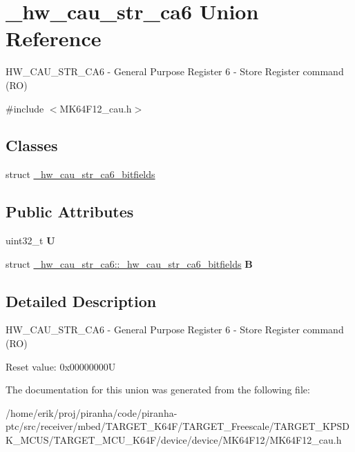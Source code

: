 \hypertarget{union__hw__cau__str__ca6}{}\section{\+\_\+hw\+\_\+cau\+\_\+str\+\_\+ca6 Union Reference}
\label{union__hw__cau__str__ca6}


H\+W\+\_\+\+C\+A\+U\+\_\+\+S\+T\+R\+\_\+\+C\+A6 -\/ General Purpose Register 6 -\/ Store Register command (RO)  




{\ttfamily \#include $<$M\+K64\+F12\+\_\+cau.\+h$>$}

\subsection*{Classes}
\begin{DoxyCompactItemize}
\item 
struct \hyperlink{struct__hw__cau__str__ca6_1_1__hw__cau__str__ca6__bitfields}{\+\_\+hw\+\_\+cau\+\_\+str\+\_\+ca6\+\_\+bitfields}
\end{DoxyCompactItemize}
\subsection*{Public Attributes}
\begin{DoxyCompactItemize}
\item 
uint32\+\_\+t {\bfseries U}\hypertarget{union__hw__cau__str__ca6_a33c04e9413b8ff3eb0d62b6d33fcaa90}{}\label{union__hw__cau__str__ca6_a33c04e9413b8ff3eb0d62b6d33fcaa90}

\item 
struct \hyperlink{struct__hw__cau__str__ca6_1_1__hw__cau__str__ca6__bitfields}{\+\_\+hw\+\_\+cau\+\_\+str\+\_\+ca6\+::\+\_\+hw\+\_\+cau\+\_\+str\+\_\+ca6\+\_\+bitfields} {\bfseries B}\hypertarget{union__hw__cau__str__ca6_a55106bf255f868a6b1b535175e891232}{}\label{union__hw__cau__str__ca6_a55106bf255f868a6b1b535175e891232}

\end{DoxyCompactItemize}


\subsection{Detailed Description}
H\+W\+\_\+\+C\+A\+U\+\_\+\+S\+T\+R\+\_\+\+C\+A6 -\/ General Purpose Register 6 -\/ Store Register command (RO) 

Reset value\+: 0x00000000U 

The documentation for this union was generated from the following file\+:\begin{DoxyCompactItemize}
\item 
/home/erik/proj/piranha/code/piranha-\/ptc/src/receiver/mbed/\+T\+A\+R\+G\+E\+T\+\_\+\+K64\+F/\+T\+A\+R\+G\+E\+T\+\_\+\+Freescale/\+T\+A\+R\+G\+E\+T\+\_\+\+K\+P\+S\+D\+K\+\_\+\+M\+C\+U\+S/\+T\+A\+R\+G\+E\+T\+\_\+\+M\+C\+U\+\_\+\+K64\+F/device/device/\+M\+K64\+F12/M\+K64\+F12\+\_\+cau.\+h\end{DoxyCompactItemize}
